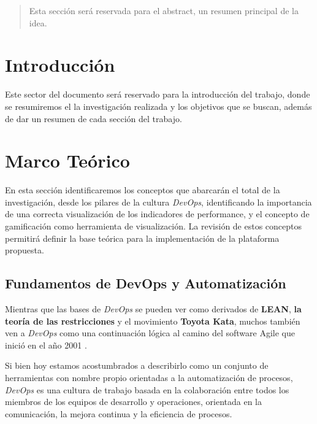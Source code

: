 \documentclass[journal]{IEEEtran}
\begin{document}
\begin{abstract}
    Esta sección será reservada para el abstract, un resumen principal de la idea.
\end{abstract}

\section{\textbf{\Large Introducción}}
Este sector del documento será reservado para la introducción del trabajo, donde se resumiremos el la investigación realizada y los objetivos que se buscan, además de dar un resumen de cada sección del trabajo.

\section{\textbf{\Large Marco Teórico}}

En esta sección identificaremos los conceptos que abarcarán el total de la investigación, desde los pilares de la cultura \textit{DevOps}, identificando la importancia de una correcta visualización de los indicadores de performance, y el concepto de gamificación como herramienta de visualización. La revisión de estos conceptos permitirá definir la base teórica para la implementación de la plataforma propuesta.

\subsection{\textbf{Fundamentos de DevOps y Automatización}}

\begin{tcolorbox}[colback=gray!10, colframe=black, left=2mm, right=2mm]
    \small %
    \ttfamily %
    \raggedright %
    Mientras que las bases de \textit{DevOps} se pueden ver como derivados de \textbf{LEAN}, \textbf{la teoría de las restricciones} y el movimiento \textbf{Toyota Kata}, muchos también ven a \textit{DevOps} como una continuación lógica al camino del software Agile que inició en el año 2001 \cite{kim2021devops}.
\end{tcolorbox}

Si bien hoy estamos acostumbrados a describirlo como un conjunto de herramientas con nombre propio orientadas a la automatización de procesos, \textit{DevOps} es una cultura de trabajo basada en la colaboración entre todos los miembros de los equipos de desarrollo y operaciones, orientada en la comunicación, la mejora continua y la eficiencia de procesos.
\end{document}
